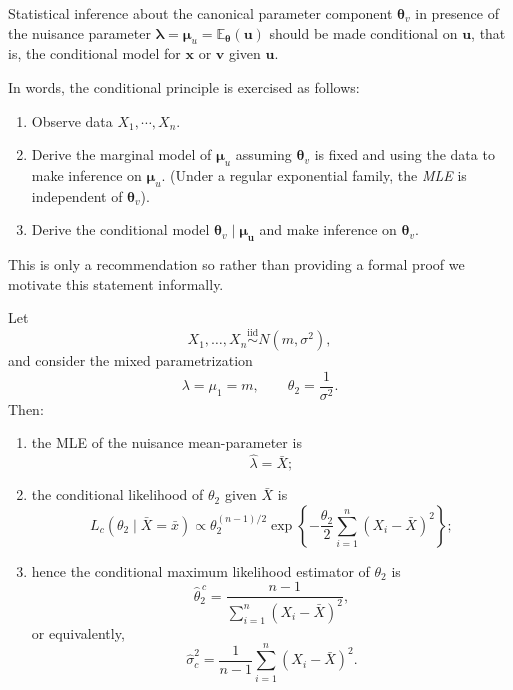 \begin{prop}
    Statistical inference about the canonical parameter component $\boldsymbol{\theta}_v$ in presence of the nuisance parameter $\boldsymbol{\lambda}=\boldsymbol{\mu}_u=\mathbb{E}_{\boldsymbol{\theta}}(\boldsymbol{u})$ should be made conditional on $\boldsymbol{u}$, that is, the conditional model for $\mathbf{x}$ or $\boldsymbol{v}$ given $\boldsymbol{u}$.
\end{prop}
\begin{remark}
    In words, the conditional principle is exercised as follows:
    \begin{enumerate}
        \item Observe data $X_1,\cdots,X_n$.
        \item Derive the marginal model of $\boldsymbol{\mu}_u$ assuming $\boldsymbol{\theta}_v$ is fixed and using the data to make inference on $\boldsymbol{\mu}_u$. (Under a regular exponential family, the \emph{MLE} is independent of $\boldsymbol{\theta}_v$).
        \item Derive the conditional model $\boldsymbol{\theta}_v\mid \boldsymbol{\mu_u}$ and make inference on $\boldsymbol{\theta}_v$.
    \end{enumerate}
\end{remark}

This is only a recommendation so rather than providing a formal proof we motivate this statement informally.
\begin{eg}
Let
\[
X_1,\dots,X_n \stackrel{\mathrm{iid}}{\sim} N(m,\sigma^2),
\]
and consider the mixed parametrization
\[
\lambda=\mu_1=m,
\qquad
\theta_2=\frac{1}{\sigma^2}.
\]
Then:
\begin{enumerate}
    \item the MLE of the nuisance mean-parameter is
    \[
    \hat\lambda=\bar X;
    \]
    \item the conditional likelihood of $\theta_2$ given $\bar X$ is
    \[
    L_c(\theta_2\mid \bar X=\bar x)\propto \theta_2^{(n-1)/2}
    \exp\!\left\{-\frac{\theta_2}{2}\sum_{i=1}^n (X_i-\bar X)^2\right\};
    \]
    \item hence the conditional maximum likelihood estimator of $\theta_2$ is
    \[
    \hat\theta_2^{\,c}
    =
    \frac{n-1}{\sum_{i=1}^n (X_i-\bar X)^2},
    \]
    or equivalently,
    \[
    \hat\sigma_c^2
    =
    \frac{1}{n-1}\sum_{i=1}^n (X_i-\bar X)^2.
    \]
\end{enumerate} 
\end{eg}

